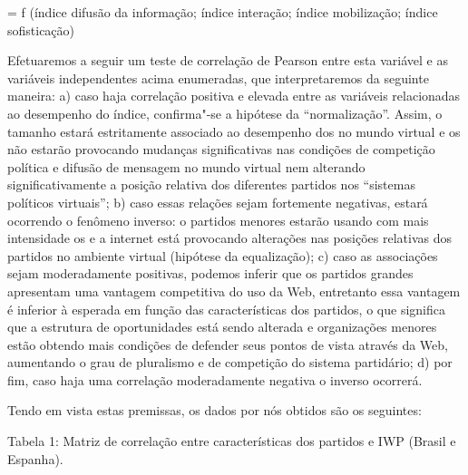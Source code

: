 \asterisc
{} = f (índice difusão da informação; índice interação; índice
mobilização; índice sofisticação)
\asterisc

Efetuaremos a seguir um teste de correlação de Pearson entre esta
variável e as variáveis independentes acima enumeradas, que
interpretaremos da seguinte maneira: a) caso haja correlação positiva e
elevada entre as variáveis relacionadas ao desempenho do índice,
confirma"-se a hipótese da ``normalização''. Assim, o tamanho estará
estritamente associado ao desempenho dos  no mundo virtual e os  não
estarão provocando mudanças significativas nas condições de competição
política e difusão de mensagem no mundo virtual nem alterando
significativamente a posição relativa dos diferentes partidos nos
``sistemas políticos virtuais''; b) caso essas relações sejam fortemente
negativas, estará ocorrendo o fenômeno inverso: o partidos menores
estarão usando com mais intensidade os  e a internet está provocando
alterações nas posições relativas dos partidos no ambiente virtual
(hipótese da equalização); c) caso as associações sejam moderadamente
positivas, podemos inferir que os partidos grandes apresentam uma
vantagem competitiva do uso da Web, entretanto essa vantagem é inferior
à esperada em função das características dos partidos, o que significa
que a estrutura de oportunidades está sendo alterada e organizações
menores estão obtendo mais condições de defender seus pontos de vista
através da Web, aumentando o grau de pluralismo e de competição do
sistema partidário; d) por fim, caso haja uma correlação moderadamente
negativa o inverso ocorrerá.

Tendo em vista estas premissas, os dados por nós obtidos são os
seguintes:

\begin{center}
Tabela 1: Matriz de correlação entre características dos partidos e IWP
(Brasil e Espanha).
\end{center}

